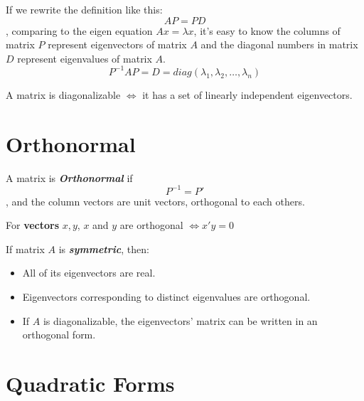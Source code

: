 \begin{remark*}
    If we rewrite the definition like this: \begin{equation*}
        AP = PD
    \end{equation*}, comparing to the eigen equation $Ax = \lambda x$, it's easy to know the columns of matrix $P$ represent eigenvectors of matrix $A$ and the diagonal numbers in matrix $D$ represent eigenvalues of matrix $A$.
    \begin{equation*}
        P ^{-1} A P = D = diag(\lambda_{1}, \lambda_{2}, \dots, \lambda_{n})
    \end{equation*}
\end{remark*}

\begin{remark*}
    A matrix is diagonalizable $\iff$ it has a set of linearly independent eigenvectors.
\end{remark*}

\section{Orthonormal}

\begin{definition}
    A matrix is \textbf{\textit{Orthonormal}} if \begin{equation*}
        P ^{-1} = P'
    \end{equation*}, and the column vectors are unit vectors, orthogonal to each others.
\end{definition}

\begin{remark*}
    For \textbf{vectors} $x, y$, $x$ and $y$ are orthogonal $\iff x'y = 0$
\end{remark*}

\begin{remark*}
    If matrix $A$ is \textbf{\textit{symmetric}}, then:
    \begin{itemize}
        \item All of its eigenvectors are real.
        \item Eigenvectors corresponding to distinct eigenvalues are orthogonal.
        \item If $A$ is diagonalizable, the eigenvectors' matrix can be written in an orthogonal form.
    \end{itemize}
\end{remark*}

\section{Quadratic Forms}

